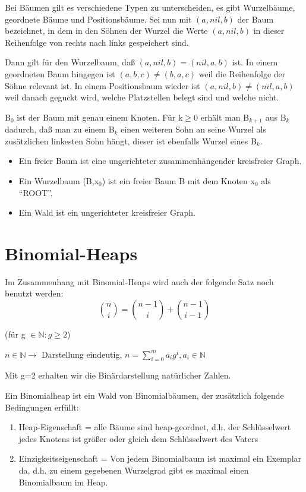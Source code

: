 Bei Bäumen gilt es verschiedene Typen zu unterscheiden, es gibt Wurzelbäume, geord\-nete Bäume und Positionsbäume.
Sei nun mit $(a,nil,b)$ der Baum bezeichnet, in dem in den Söhnen der Wurzel die Werte $(a,nil,b)$ in dieser Reihenfolge von rechts nach
links gespeichert sind.

Dann gilt für den Wurzelbaum, daß $(a,nil,b)=(nil,a,b)$ ist. In einem geordneten Baum hingegen ist
$(a,b,c)\neq(b,a,c)$ weil die Reihenfolge der Söhne relevant ist. In einem Positionsbaum wieder ist
$(a,nil,b)\neq(nil,a,b)$ weil danach geguckt wird, welche Platzstellen belegt sind und welche nicht.

\begin{definition}[Binomialbäume]
B$_0$ ist der Baum mit genau einem Knoten. Für k$\geq$0 erhält man B$_{k+1}$ aus B$_k$ dadurch, daß man zu einem
B$_k$ einen weiteren Sohn an seine Wurzel als zusätzlichen linkesten Sohn hängt, dieser ist ebenfalls Wurzel eines
B$_k$.
\end{definition}

\begin{definition}
\begin{itemize}
\item Ein freier Baum ist eine ungerichteter zusammenhängender kreisfreier Graph.
\item Ein Wurzelbaum (B,x$_0$) ist ein freier Baum B mit dem Knoten x$_0$ als "`ROOT"'.
\item Ein Wald ist ein ungerichteter kreisfreier Graph. 
\end{itemize}
\end{definition}

\section{Binomial-Heaps}  
\begin{satz}
Im Zusammenhang mit Binomial-Heaps wird auch der folgende Satz noch benutzt werden:
\[\binom{n}{i}=\binom{n-1}{i}+\binom{n-1}{i-1}\]
\end{satz}

\begin{satz}
(für g $\in \mathbb{N} : g\geq 2$)

$n \in \mathbb{N} \rightarrow$ Darstellung eindeutig, $n=\sum_{i=0}^m a_i g^i, a_i \in \mathbb{N}$
\end{satz}
Mit g=2 erhalten wir die Binärdarstellung natürlicher Zahlen.

\begin{definition}[Binomialheap]  
Ein Binomialheap ist ein Wald von Binomialbäumen, der zusätzlich folgende Bedingung\-en erfüllt:
\begin{enumerate}
\item Heap-Eigenschaft = alle Bäume sind heap-geordnet, d.h. der Schlüsselwert jedes Knotens ist größer oder gleich dem
Schlüsselwert des Vaters
\item Einzigkeitseigenschaft = Von jedem Binomialbaum ist maximal ein Exemplar da, d.h. zu einem gegebenen Wurzelgrad
gibt es maximal einen Binomialbaum im Heap.
\end{enumerate}
\end{definition}

